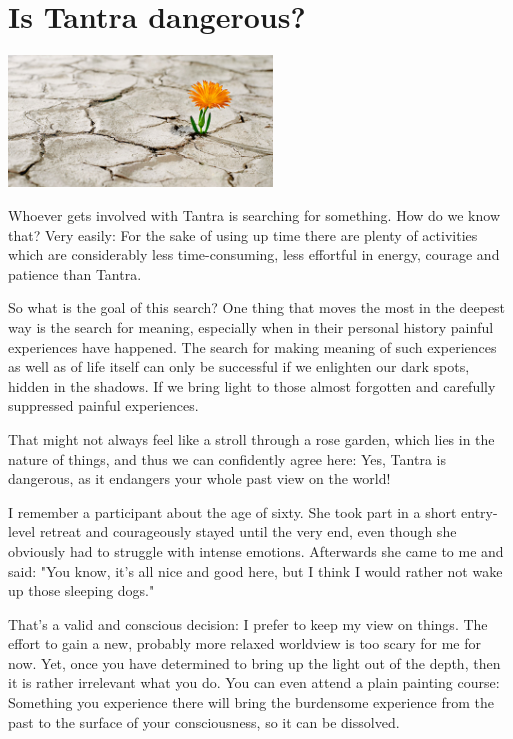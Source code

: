 \section{Is Tantra dangerous?}

\begin{center}
\includegraphics[width=7cm]{images/09_dangerous.jpg}
\end{center}

Whoever gets involved with Tantra is searching for something. How do we know that? Very easily: For the sake of using up time there are plenty of activities which are considerably less time-consuming, less effortful in energy, courage and patience than Tantra.

So what is the goal of this search? One thing that moves the most in the deepest way is the search for meaning, especially when in their personal history painful experiences  have happened. The search for making meaning of such experiences as well as of life itself can only be successful if we enlighten our dark spots, hidden in the shadows. If we bring light to those almost forgotten and carefully suppressed painful experiences.

That might not always feel like a stroll through a rose garden, which lies in the nature of things, and thus we can confidently agree here: Yes, Tantra is dangerous, as it endangers your whole past view on the world!

I remember a participant about the age of sixty. She took part in a short entry-level retreat and courageously stayed until the very end, even though she obviously had to struggle with intense emotions. Afterwards she came to me and said: "You know, it's all nice and good here, but I think I would rather not wake up those sleeping dogs."

That's a valid and conscious decision: I prefer to keep my view on things. The effort to gain a new, probably more relaxed worldview is too scary for me for now. Yet, once you have determined to bring up the light out of the depth, then it is rather irrelevant what you do. You can even attend a plain painting course: Something you experience there will bring the burdensome experience from the past to the surface of your consciousness, so it can be dissolved.


